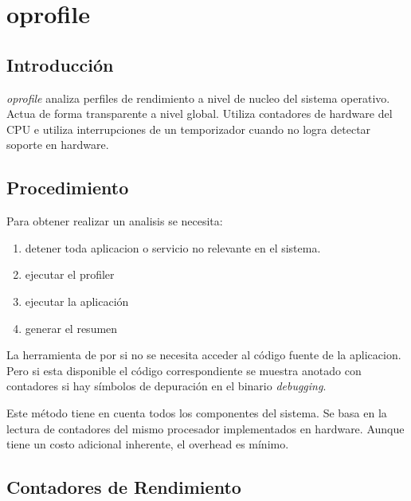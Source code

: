 \documentclass[a4paper]{report}
\begin{document}
\section{oprofile}

\subsection{Introducci\'on}

{\it oprofile} analiza perfiles de rendimiento a nivel de nucleo del
sistema operativo. Actua de forma transparente a nivel global. Utiliza
contadores de hardware del CPU e utiliza interrupciones de un temporizador
cuando no logra detectar soporte en hardware.


\subsection{Procedimiento}

Para obtener realizar un analisis se necesita:

\begin{enumerate}

\item detener toda aplicacion o servicio no relevante en el sistema.

\item ejecutar el profiler

\item ejecutar la aplicaci\'on

\item generar el resumen

\end{enumerate}

La herramienta de por si no se necesita acceder al c\'odigo fuente de la aplicacion.
Pero si esta disponible el c\'odigo correspondiente se muestra anotado con contadores
si hay s\'imbolos de depuraci\'on en el binario {\it debugging}.

Este m\'etodo tiene en cuenta todos los componentes del sistema.
Se basa en la lectura de contadores del mismo procesador implementados en hardware.
Aunque tiene un costo adicional inherente, el overhead es m\'inimo.

\subsection{Contadores de Rendimiento}
\end{document}
